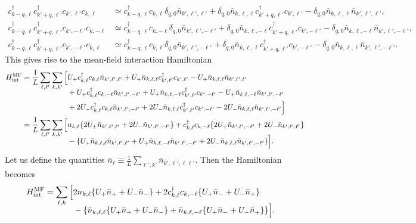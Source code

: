 \documentclass[english, parskip=full]{scrartcl}
\begin{document}
\begin{align}
c_{k-q,\ell}^\dagger c_{k'+q,\ell'}^\dagger c_{k',\ell'} c_{k,\ell} &\simeq c_{k-q,\ell}^\dagger c_{k,\ell} \delta_{q,0} \bar{n}_{k',\ell',\ell'} + \delta_{q,0} \bar{n}_{k,\ell,\ell} c_{k'+q,\ell'}^\dagger c_{k',\ell'} - \delta_{q,0} \bar{n}_{k,\ell,\ell} \bar{n}_{k',\ell',\ell'},\\
c_{k-q,\ell}^\dagger c_{k'+q,\ell'}^\dagger c_{k',-\ell'} c_{k,-\ell} &\simeq c_{k-q,\ell}^\dagger c_{k,-\ell} \delta_{q,0} \bar{n}_{k',\ell',-\ell'} + \delta_{q,0} \bar{n}_{k,\ell,-\ell} c_{k'+q,\ell'}^\dagger c_{k',-\ell'} - \delta_{q,0} \bar{n}_{k,\ell,-\ell} \bar{n}_{k',\ell',-\ell'},\\
c_{k-q,\ell}^\dagger c_{k'+q,\ell'}^\dagger c_{k',-\ell'} c_{k,\ell} &\simeq c_{k-q,\ell}^\dagger c_{k,\ell} \delta_{q,0} \bar{n}_{k',\ell',-\ell'} + \delta_{q,0} \bar{n}_{k,\ell,\ell} c_{k'+q,\ell'}^\dagger c_{k',-\ell'} - \delta_{q,0} \bar{n}_{k,\ell,\ell} \bar{n}_{k',\ell',-\ell'}.
\end{align}
This gives rise to the mean-field interaction Hamiltonian
\begin{align}
H_\Text{int}^\Text{MF} &= \frac{1}{L} \sum_{\ell,\ell'} \sum_{k,k'} \bsplit{ \klb[\Big]{&U_+c_{k,\ell}^\dagger c_{k,\ell} \bar{n}_{k',\ell',\ell'} + U_+ \bar{n}_{k,\ell,\ell} c_{k',\ell'}^\dagger c_{k',\ell'} - U_+ \bar{n}_{k,\ell,\ell} \bar{n}_{k',\ell',\ell'} \\
&+U_+ c_{k,\ell}^\dagger c_{k,-\ell} \bar{n}_{k',\ell',-\ell'} + U_+ \bar{n}_{k,\ell,-\ell} c_{k',\ell'}^\dagger c_{k',-\ell'} - U_+ \bar{n}_{k,\ell,-\ell} \bar{n}_{k',\ell',-\ell'}\\
&+ 2U_- c_{k,\ell}^\dagger c_{k,\ell} \bar{n}_{k',\ell',-\ell'} + 2U_- \bar{n}_{k,\ell,\ell} c_{k',\ell'}^\dagger c_{k',-\ell'} - 2U_- \bar{n}_{k,\ell,\ell} \bar{n}_{k',\ell',-\ell'}}}\\
&= \frac{1}{L} \sum_{\ell,\ell'} \sum_{k,k'} \bsplit{\klb[\Big]{ &n_{k,\ell} \klc*{2U_+ \bar{n}_{k',\ell',\ell'} + 2U_- \bar{n}_{k',\ell',-\ell'} } + c_{k,\ell}^\dagger c_{k,-\ell} \klc*{2U_+ \bar{n}_{k',\ell',-\ell'} + 2U_- \bar{n}_{k',\ell',\ell'}}\\
&- \klc*{U_+ \bar{n}_{k,\ell,\ell} \bar{n}_{k',\ell',\ell'} + U_+ \bar{n}_{k,\ell,-\ell} \bar{n}_{k',\ell',-\ell'} + 2U_- \bar{n}_{k,\ell,\ell} \bar{n}_{k',\ell',-\ell'}} }.}
\end{align}
Let us define the quantities $\bar{n}_\ell \equiv \frac{1}{L} \sum_{\ell',k'} \bar{n}_{k',\ell',\ell \ell'}$.
Then the Hamiltonian becomes
\begin{align}
H_\Text{int}^\Text{MF} &= \sum_{\ell,k} \bsplit{\klb[\Big]{&2n_{k,\ell} \klc*{U_+ \bar{n}_+ + U_- \bar{n}_-} + 2c_{k,\ell}^\dagger c_{k,-\ell} \klc*{U_+ \bar{n}_- + U_- \bar{n}_+} \\
&- \klc*{\bar{n}_{k,\ell,\ell} \klc*{U_+ \bar{n}_+ + U_- \bar{n}_-} + \bar{n}_{k,\ell,-\ell} \klc*{U_+ \bar{n}_- + U_- \bar{n}_+}}}.}
\end{align}
\end{document}
